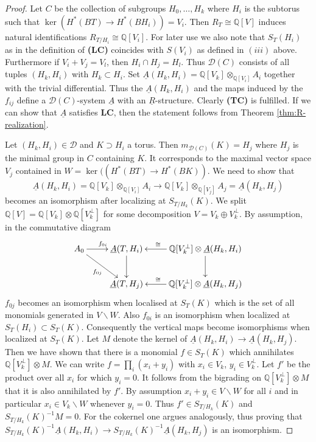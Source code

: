 \documentclass[12pt,a4paper]{article}
\theoremstyle{definition}
\begin{document}
\begin{proof}
Let $C$ be the collection of subgroups $H_0,\ldots,H_k$ where $H_i$ is the subtorus such that $\ker (H^*(BT)\rightarrow H^*(BH_i))=V_i$. Then $R_T\cong \mathbb{Q}[V]$ induces natural identifications $R_{T/H_i}\cong \mathbb{Q}[V_i]$. For later use we also note that $S_{T}(H_i)$ as in the definition of \textbf{(LC)} coincides with $S(V_i)$ as defined in $(iii)$ above.
Furthermore if $V_i+V_j=V_l$, then $H_i\cap H_j=H_l$. Thus $\mathcal{D}(C)$ consists of all tuples $(H_k,H_i)$ with $H_k\subset H_i$. Set $\underline{A}(H_k,H_i)=\mathbb{Q}[V_k]\otimes_{\mathbb{Q}[V_i]} A_i$ together with the trivial differential. Thus the $\underline{A}(H_k,H_i)$ and the maps induced by the $f_{ij}$ define a $\mathcal{D}(C)$-system $\underline{A}$ with an $\underline{R}$-structure. Clearly \textbf{(TC)} is fulfilled. If we can show that $\underline{A}$ satisfies \textbf{LC}, then the statement follows from Theorem \ref{thm:R-realization}. 

Let $(H_k,H_i)\in \mathcal{D}$ and $K\supset H_i$ a torus. Then $m_{\mathcal{D}(C)}(K)=H_j$ where $H_j$ is the minimal group in $C$ containing $K$. It corresponds to the maximal vector space $V_j$ contained in $W=\ker((H^*(BT)\rightarrow H^*(BK))$. We need to show that
\[\underline{A}(H_k,H_i)=\mathbb{Q}[V_k]\otimes_{\mathbb{Q}[V_i]} A_i\rightarrow \mathbb{Q}[V_k]\otimes_{\mathbb{Q}[V_j]} A_j=\underline{A}(H_k,H_j)\]
becomes an isomorphism after localizing at $S_{T/H_k}(K)$. We split $\mathbb{Q}[V]=\mathbb{Q}[V_k]\otimes \mathbb{Q}[V_k^\perp]$ for some decomposition $V=V_k\oplus V_k^\perp$. By assumption, in the commutative diagram
\[\xymatrix{
A_0\ar[r]^{f_{0i}}\ar[dr]_{f_{0j}} & \underline{A}(T,H_i)\ar[d]&\ar[l]_(.6)\cong \mathbb{Q}[V_k^\perp]\otimes \underline{A}(H_k,H_i)\ar[d]
\\ & \underline{A}(T,H_j) &\ar[l]_(.6)\cong \mathbb{Q}[V_k^\perp]\otimes \underline{A}(H_k,H_j)
}\]
$f_{0j}$ becomes an isomorphism when localised at $S_T(K)$ which is the set of all monomials generated in $V\backslash W$. Also $f_{0i}$ is an isomorphism when localized at $S_T(H_i)\subset S_T(K)$. Consequently the vertical maps become isomorphisms when localized at $S_T(K)$. Let $M$ denote the kernel of $\underline{A}(H_k,H_i)\rightarrow \underline{A}(H_k,H_j)$. Then we have shown that there is a monomial $f\in S_T(K)$ which annihilates $\mathbb{Q}[V_k^\perp]\otimes M$. We can write $f=\prod_i(x_i+y_i)$ with $x_i\in V_k$, $y_i\in V_k^\perp$. Let $f'$ be the product over all $x_i$ for which $y_i=0$. It follows from the bigrading on $\mathbb{Q}[V_k^{\perp}]\otimes M$ that it is also annihilated by $f'$. By assumption $x_i+y_i \in V\backslash W$ for all $i$ and in particular $x_i\in V_k\backslash W$ whenever $y_i=0$. Thus $f'\in S_{T/H_k}(K)$ and $S_{T/H_k}(K)^{-1}M=0$. For the cokernel one argues analogously, thus proving that $S_{T/H_k}(K)^{-1} \underline{A}(H_k,H_i)\rightarrow S_{T/H_k}(K)^{-1} \underline{A}(H_k,H_j)$ is an isomorphism.
\end{proof}
\end{document}
